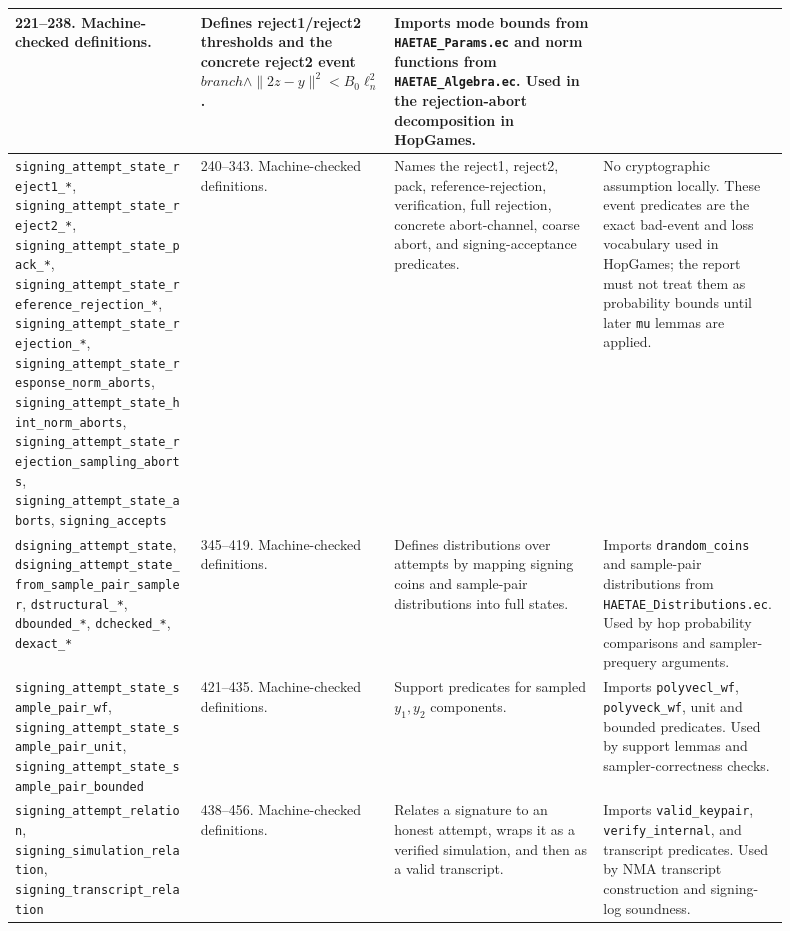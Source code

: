 \documentclass[11pt]{report}
\DeclareRobustCommand{\file}[1]{\ifmmode\text{\nolinkurl{#1}}\else\nolinkurl{#1}\fi}
\DeclareRobustCommand{\ec}[1]{\ifmmode\text{\nolinkurl{#1}}\else\nolinkurl{#1}\fi}
\theoremstyle{definition}
\theoremstyle{plain}
\begin{document}
{\begin{longtable}{p{0.24\linewidth}p{0.15\linewidth}p{0.27\linewidth}p{0.24\linewidth}}
221--238. Machine-checked definitions. &
Defines reject1/reject2 thresholds and the concrete reject2 event
\(branch \land \|2z-y\|^2 < B_0 \ell_n^2\). &
Imports mode bounds from \file{HAETAE\_Params.ec} and norm functions from
\file{HAETAE\_Algebra.ec}.  Used in the rejection-abort decomposition in
HopGames. \\
\midrule
\ec{signing\_attempt\_state\_reject1\_*},
\ec{signing\_attempt\_state\_reject2\_*},
\ec{signing\_attempt\_state\_pack\_*},
\ec{signing\_attempt\_state\_reference\_rejection\_*},
\ec{signing\_attempt\_state\_rejection\_*},
\ec{signing\_attempt\_state\_response\_norm\_aborts},
\ec{signing\_attempt\_state\_hint\_norm\_aborts},
\ec{signing\_attempt\_state\_rejection\_sampling\_aborts},
\ec{signing\_attempt\_state\_aborts},
\ec{signing\_accepts} &
240--343. Machine-checked definitions. &
Names the reject1, reject2, pack, reference-rejection, verification, full
rejection, concrete abort-channel, coarse abort, and signing-acceptance
predicates. &
No cryptographic assumption locally.  These event predicates are the exact
bad-event and loss vocabulary used in HopGames; the report must not treat them
as probability bounds until later \ec{mu} lemmas are applied. \\
\midrule
\ec{dsigning\_attempt\_state},
\ec{dsigning\_attempt\_state\_from\_sample\_pair\_sampler},
\ec{dstructural\_*}, \ec{dbounded\_*}, \ec{dchecked\_*}, \ec{dexact\_*} &
345--419. Machine-checked definitions. &
Defines distributions over attempts by mapping signing coins and sample-pair
distributions into full states. &
Imports \ec{drandom\_coins} and sample-pair distributions from
\file{HAETAE\_Distributions.ec}.  Used by hop probability comparisons and
sampler-prequery arguments. \\
\midrule
\ec{signing\_attempt\_state\_sample\_pair\_wf},
\ec{signing\_attempt\_state\_sample\_pair\_unit},
\ec{signing\_attempt\_state\_sample\_pair\_bounded} &
421--435. Machine-checked definitions. &
Support predicates for sampled \(y_1,y_2\) components. &
Imports \ec{polyvecl\_wf}, \ec{polyveck\_wf}, unit and bounded predicates.
Used by support lemmas and sampler-correctness checks. \\
\midrule
\ec{signing\_attempt\_relation},
\ec{signing\_simulation\_relation},
\ec{signing\_transcript\_relation} &
438--456. Machine-checked definitions. &
Relates a signature to an honest attempt, wraps it as a verified simulation,
and then as a valid transcript. &
Imports \ec{valid\_keypair}, \ec{verify\_internal}, and transcript predicates.
Used by NMA transcript construction and signing-log soundness. \\

\end{longtable}}
\end{document}
